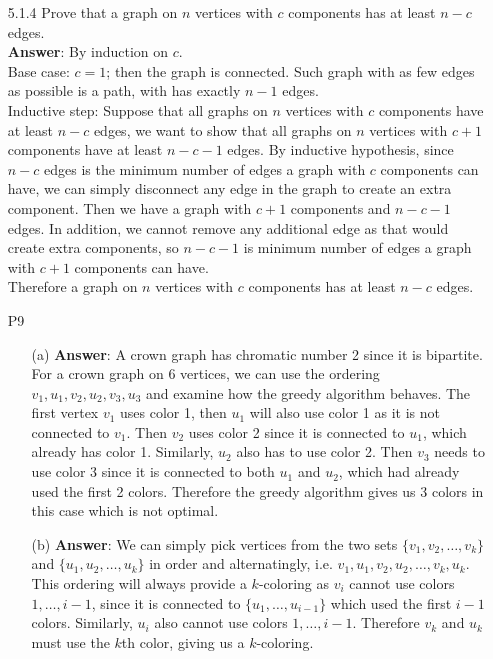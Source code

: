 \documentclass{article}
\begin{document}
\begin{itemize}
      \item [5.1.4] Prove that a graph on $n$ vertices with $c$ components has at least $n-c$ edges.\\
            \textbf{Answer}: By induction on $c$.\\
            Base case: $c=1$; then the graph is connected. Such graph with as few edges as possible is a path, with has exactly $n-1$ edges.\\
            Inductive step: Suppose that all graphs on $n$ vertices with $c$ components have at least $n-c$ edges, we want to show that all graphs on $n$ vertices with $c+1$ components have at least $n-c-1$ edges. By inductive hypothesis, since $n-c$ edges is the minimum number of edges a graph with $c$ components can have, we can simply disconnect any edge in the graph to create an extra component. Then we have a graph with $c+1$ components and $n-c-1$ edges. In addition, we cannot remove any additional edge as that would create extra components, so $n-c-1$ is minimum number of edges a graph with $c+1$ components can have.\\
            Therefore a graph on $n$ vertices with $c$ components has at least $n-c$ edges.
      \item [P9]
            \begin{itemize}
                  \item [(a)]
                        \textbf{Answer}: A crown graph has chromatic number 2 since it is bipartite. For a crown graph on 6 vertices, we can use the ordering $v_1,u_1,v_2,u_2,v_3,u_3$ and examine how the greedy algorithm behaves. The first vertex $v_1$ uses color 1, then $u_1$ will also use color 1 as it is not connected to $v_1$. Then $v_2$ uses color 2 since it is connected to $u_1$, which already has color 1. Similarly, $u_2$ also has to use color 2. Then $v_3$ needs to use color 3 since it is connected to both $u_1$ and $u_2$, which had already used the first 2 colors. Therefore the greedy algorithm gives us 3 colors in this case which is not optimal.
                  \item [(b)]
                        \textbf{Answer}: We can simply pick vertices from the two sets $\{v_1,v_2,\ldots,v_k\}$ and $\{u_1,u_2,\ldots,u_k\}$ in order and alternatingly, i.e. $v_1,u_1,v_2,u_2,\ldots,v_k,u_k$. This ordering will always provide a $k$-coloring as $v_i$ cannot use colors $1,\ldots,i-1$, since it is connected to $\{u_1,\ldots,u_{i-1}\}$ which used the first $i-1$ colors. Similarly, $u_i$ also cannot use colors $1,\ldots,i-1$. Therefore $v_k$ and $u_k$ must use the $k$th color, giving us a $k$-coloring.
            \end{itemize}
\end{itemize}
\end{document}
